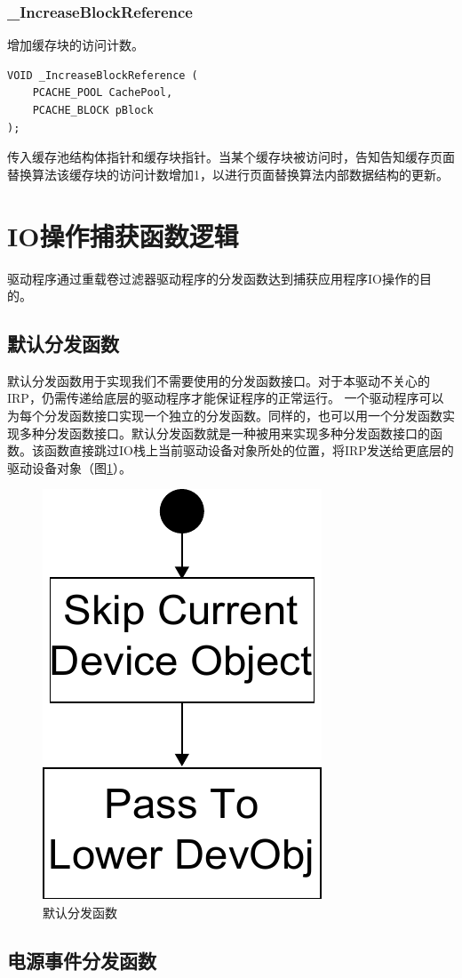 \subsubsection{\_IncreaseBlockReference}
增加缓存块的访问计数。
\begin{lstlisting}
VOID _IncreaseBlockReference (
    PCACHE_POOL CachePool,
    PCACHE_BLOCK pBlock
);
\end{lstlisting}

传入缓存池结构体指针和缓存块指针。当某个缓存块被访问时，告知告知缓存页面替换算法该缓存块的访问计数增加1，以进行页面替换算法内部数据结构的更新。


\section{IO操作捕获函数逻辑}
\label{sec:capture_io_logic}

驱动程序通过重载卷过滤器驱动程序的分发函数达到捕获应用程序IO操作的目的。

\subsection{默认分发函数}

默认分发函数用于实现我们不需要使用的分发函数接口。对于本驱动不关心的IRP，仍需传递给底层的驱动程序才能保证程序的正常运行。
一个驱动程序可以为每个分发函数接口实现一个独立的分发函数。同样的，也可以用一个分发函数实现多种分发函数接口。默认分发函数就是一种被用来实现多种分发函数接口的函数。该函数直接跳过IO栈上当前驱动设备对象所处的位置，将IRP发送给更底层的驱动设备对象（图\ref{fig:df-default}）。

\begin{figure}[!ht]
\centering
\includegraphics[width=0.20\linewidth]{./graph/df-default}
\caption{默认分发函数}
\label{fig:df-default}
\end{figure}

\subsection{电源事件分发函数}

